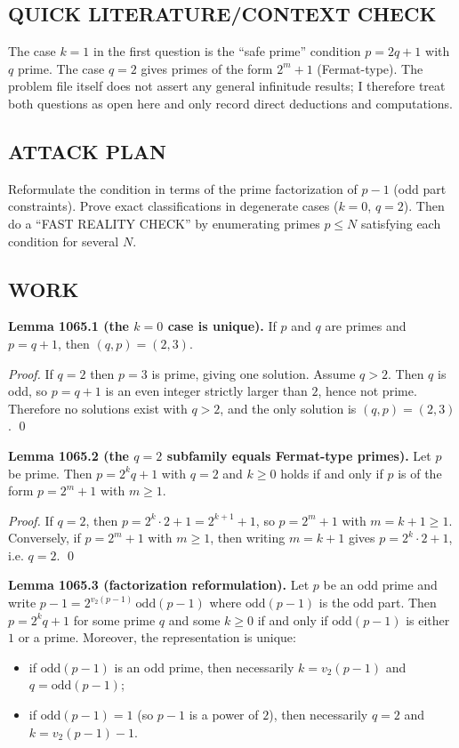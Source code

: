 \subsection*{QUICK LITERATURE/CONTEXT CHECK}
The case $k=1$ in the first question is the ``safe prime'' condition $p=2q+1$ with $q$ prime.  The case $q=2$ gives primes of the form $2^m+1$ (Fermat-type).  The problem file itself does not assert any general infinitude results; I therefore treat both questions as open here and only record direct deductions and computations.

\subsection*{ATTACK PLAN}
Reformulate the condition in terms of the prime factorization of $p-1$ (odd part constraints).  Prove exact classifications in degenerate cases ($k=0$, $q=2$).  Then do a ``FAST REALITY CHECK'' by enumerating primes $p\le N$ satisfying each condition for several $N$.

\subsection*{WORK}
\textbf{Lemma 1065.1 (the $k=0$ case is unique).}
If $p$ and $q$ are primes and $p=q+1$, then $(q,p)=(2,3)$.

\emph{Proof.}
If $q=2$ then $p=3$ is prime, giving one solution.
Assume $q>2$. Then $q$ is odd, so $p=q+1$ is an even integer strictly larger than $2$, hence not prime.  Therefore no solutions exist with $q>2$, and the only solution is $(q,p)=(2,3)$. \qed

\textbf{Lemma 1065.2 (the $q=2$ subfamily equals Fermat-type primes).}
Let $p$ be prime. Then $p=2^k q+1$ with $q=2$ and $k\ge 0$ holds if and only if $p$ is of the form $p=2^m+1$ with $m\ge 1$.

\emph{Proof.}
If $q=2$, then $p = 2^k\cdot 2 + 1 = 2^{k+1}+1$, so $p=2^m+1$ with $m=k+1\ge 1$.
Conversely, if $p=2^m+1$ with $m\ge 1$, then writing $m=k+1$ gives $p=2^k\cdot 2+1$, i.e. $q=2$. \qed

\textbf{Lemma 1065.3 (factorization reformulation).}
Let $p$ be an odd prime and write $p-1=2^{v_2(p-1)}\,\mathrm{odd}(p-1)$ where $\mathrm{odd}(p-1)$ is the odd part.
Then $p=2^k q+1$ for some prime $q$ and some $k\ge 0$ if and only if $\mathrm{odd}(p-1)$ is either $1$ or a prime.
Moreover, the representation is unique:
\begin{itemize}
\item if $\mathrm{odd}(p-1)$ is an odd prime, then necessarily $k=v_2(p-1)$ and $q=\mathrm{odd}(p-1)$;
\item if $\mathrm{odd}(p-1)=1$ (so $p-1$ is a power of $2$), then necessarily $q=2$ and $k=v_2(p-1)-1$.
\end{itemize}

